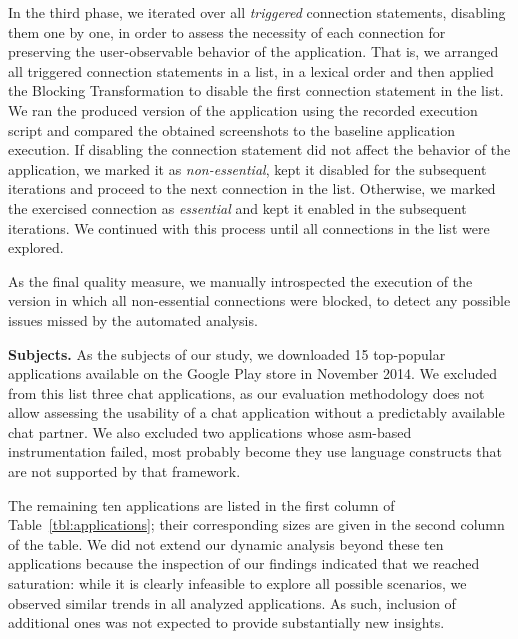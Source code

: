 In the third phase, we iterated over all \emph{triggered} connection statements, disabling them one by one, in order to assess
the necessity of each connection for preserving the user-observable behavior of the application. 
That is, we arranged all triggered connection statements in a list, in a lexical order and then applied the Blocking Transformation to disable the first connection statement in the list.   
We ran the produced version of the application using the recorded execution script and compared the obtained screenshots to the baseline application execution. If disabling the connection statement did not affect the behavior of the application, we marked it as \emph{non-essential}, kept it disabled for the subsequent iterations and proceed to the next connection in the list.
Otherwise, we marked the exercised connection as \emph{essential} and kept it enabled in the subsequent iterations.
We continued with this process until all connections in the list were explored.

As the final quality measure, we manually introspected the execution of the version in which all non-essential connections
were blocked, to detect any  possible issues missed by the automated analysis.



\vspace{0.1in}
\noindent 
{\bf Subjects.} 
As the subjects of our study, we downloaded 15 top-popular applications available on the Google Play store in November 2014. 
We excluded from this list three chat applications, as our evaluation methodology does not allow assessing the usability of a chat application without a predictably available chat partner. 
We also excluded two applications whose asm-based instrumentation failed, most probably become they use language constructs that are not supported by that framework.

The remaining ten applications are listed in the first column of Table~\ref{tbl:applications}; their corresponding sizes are given in the second column of the table. 
We did not extend our dynamic analysis beyond these ten applications because the inspection of our findings indicated that we reached saturation: while it is clearly infeasible to explore all possible scenarios, we observed similar trends in all analyzed applications. As such, inclusion of additional ones was not expected to provide substantially new insights. 

